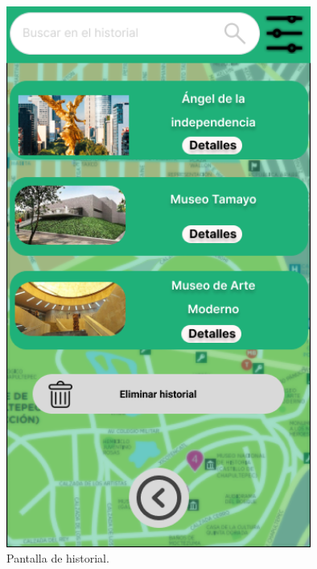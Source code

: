 \begin{figure}[htb]
    \centering
    \includegraphics[width=10cm]{pantalla15.png}
    \caption{Pantalla de historial.}
    \label{fig:enter-label}
\end{figure}

